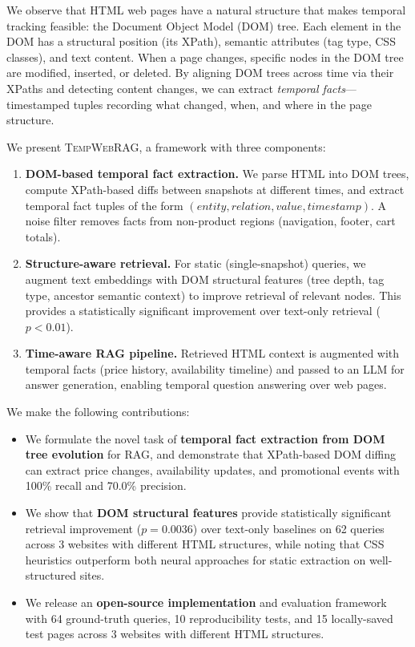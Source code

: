 \documentclass[11pt]{article}
\newcommand{\ours}{\textsc{TempWebRAG}}
\begin{document}
We observe that HTML web pages have a natural structure that makes temporal tracking feasible: the Document Object Model (DOM) tree. Each element in the DOM has a structural position (its XPath), semantic attributes (tag type, CSS classes), and text content. When a page changes, specific nodes in the DOM tree are modified, inserted, or deleted. By aligning DOM trees across time via their XPaths and detecting content changes, we can extract \emph{temporal facts}---timestamped tuples recording what changed, when, and where in the page structure.

We present \ours{}, a framework with three components:

\begin{enumerate}
    \item \textbf{DOM-based temporal fact extraction.} We parse HTML into DOM trees, compute XPath-based diffs between snapshots at different times, and extract temporal fact tuples of the form $(entity, relation, value, timestamp)$. A noise filter removes facts from non-product regions (navigation, footer, cart totals).

    \item \textbf{Structure-aware retrieval.} For static (single-snapshot) queries, we augment text embeddings with DOM structural features (tree depth, tag type, ancestor semantic context) to improve retrieval of relevant nodes. This provides a statistically significant improvement over text-only retrieval ($p < 0.01$).

    \item \textbf{Time-aware RAG pipeline.} Retrieved HTML context is augmented with temporal facts (price history, availability timeline) and passed to an LLM for answer generation, enabling temporal question answering over web pages.
\end{enumerate}

We make the following contributions:

\begin{itemize}
    \item We formulate the novel task of \textbf{temporal fact extraction from DOM tree evolution} for RAG, and demonstrate that XPath-based DOM diffing can extract price changes, availability updates, and promotional events with 100\% recall and 70.0\% precision.

    \item We show that \textbf{DOM structural features} provide statistically significant retrieval improvement ($p = 0.0036$) over text-only baselines on 62 queries across 3 websites with different HTML structures, while noting that CSS heuristics outperform both neural approaches for static extraction on well-structured sites.

    \item We release an \textbf{open-source implementation} and evaluation framework with 64 ground-truth queries, 10 reproducibility tests, and 15 locally-saved test pages across 3 websites with different HTML structures.
\end{itemize}
\end{document}
